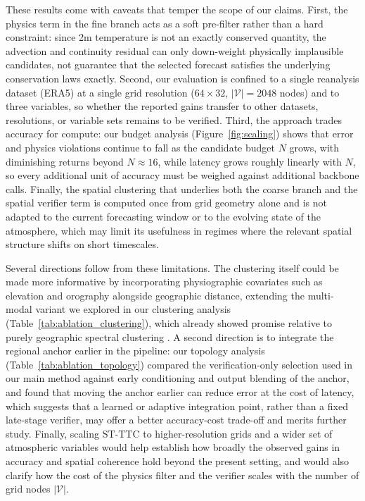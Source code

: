 \documentclass[preprint,12pt]{elsarticle}
\begin{document}
These results come with caveats that temper the scope of our claims. First, the physics term in the fine branch acts as a soft pre-filter rather than a hard constraint: since 2m temperature is not an exactly conserved quantity, the advection and continuity residual can only down-weight physically implausible candidates, not guarantee that the selected forecast satisfies the underlying conservation laws exactly. Second, our evaluation is confined to a single reanalysis dataset (ERA5) at a single grid resolution ($64\times32$, $|\mathcal{V}|=2048$ nodes) and to three variables, so whether the reported gains transfer to other datasets, resolutions, or variable sets remains to be verified. Third, the approach trades accuracy for compute: our budget analysis (Figure~\ref{fig:scaling}) shows that error and physics violations continue to fall as the candidate budget $N$ grows, with diminishing returns beyond $N\approx16$, while latency grows roughly linearly with $N$, so every additional unit of accuracy must be weighed against additional backbone calls. Finally, the spatial clustering that underlies both the coarse branch and the spatial verifier term is computed once from grid geometry alone and is not adapted to the current forecasting window or to the evolving state of the atmosphere, which may limit its usefulness in regimes where the relevant spatial structure shifts on short timescales.

Several directions follow from these limitations. The clustering itself could be made more informative by incorporating physiographic covariates such as elevation and orography alongside geographic distance, extending the multi-modal variant we explored in our clustering analysis (Table~\ref{tab:ablation_clustering}), which already showed promise relative to purely geographic spectral clustering \citep{ng2002spectral,vonluxburg2007tutorial}. A second direction is to integrate the regional anchor earlier in the pipeline: our topology analysis (Table~\ref{tab:ablation_topology}) compared the verification-only selection used in our main method against early conditioning and output blending of the anchor, and found that moving the anchor earlier can reduce error at the cost of latency, which suggests that a learned or adaptive integration point, rather than a fixed late-stage verifier, may offer a better accuracy-cost trade-off and merits further study. Finally, scaling ST-TTC to higher-resolution grids and a wider set of atmospheric variables would help establish how broadly the observed gains in accuracy and spatial coherence hold beyond the present setting, and would also clarify how the cost of the physics filter and the verifier scales with the number of grid nodes $|\mathcal{V}|$.

\newpage

\end{document}
